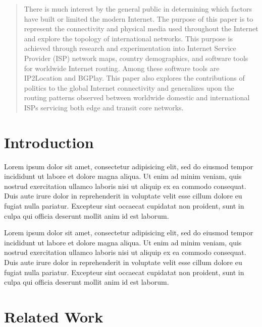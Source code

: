 \documentclass{sigcomm-alternate}
\begin{document}
\maketitle

\begin{abstract}
    There is much interest by the general public in determining which factors have built or limited the modern Internet. The purpose of this paper is to represent the connectivity and physical media used throughout the Internet and explore the topology of international networks. This purpose is achieved through research and experimentation into Internet Service Provider (ISP) network maps, country demographics, and software tools for worldwide Internet routing. Among these software tools are IP2Location and BGPlay. This paper also explores the contributions of politics to the global Internet connectivity and generalizes upon the routing patterns observed between worldwide domestic and international ISPs servicing both edge and transit core networks.
\end{abstract}

\section{Introduction}
Lorem ipsum dolor sit amet, consectetur adipisicing elit, sed do eiusmod tempor incididunt ut labore et dolore magna aliqua. Ut enim ad minim veniam, quis nostrud exercitation ullamco laboris nisi ut aliquip ex ea commodo\cite{latexcompanion} consequat. Duis aute irure dolor in reprehenderit in voluptate velit esse cillum dolore eu fugiat nulla pariatur. Excepteur sint occaecat cupidatat non proident, sunt in culpa qui officia deserunt mollit anim id est laborum.

Lorem ipsum dolor sit amet, consectetur\cite{einstein} adipisicing elit, sed do eiusmod tempor incididunt ut labore et dolore magna aliqua. Ut enim ad minim veniam, quis nostrud exercitation ullamco laboris nisi ut aliquip ex ea commodo consequat. Duis aute irure dolor in reprehenderit\cite{knuthwebsite} in voluptate velit esse cillum dolore eu fugiat nulla pariatur. Excepteur sint occaecat cupidatat non proident, sunt in culpa qui officia deserunt mollit anim id est laborum.


\section{Related Work}
\end{document}
